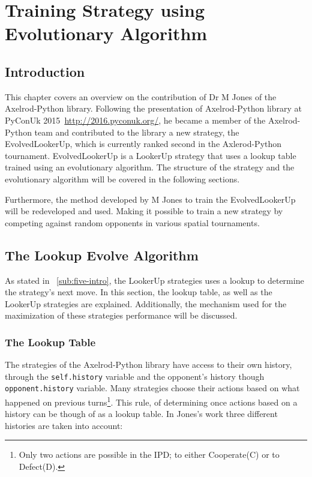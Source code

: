 \chapter{Training Strategy using Evolutionary Algorithm}
\section{Introduction}
\label{sub:five-intro}
This chapter covers an overview on the contribution of Dr M Jones
of the Axelrod-Python library. Following the presentation of Axelrod-Python
library at PyConUk 2015~\url{http://2016.pyconuk.org/}, he became a member of
the Axelrod-Python team and contributed to the library a new strategy, the
EvolvedLookerUp, which is currently ranked second in the Axlerod-Python tournament.
EvolvedLookerUp is a LookerUp strategy that uses a lookup table trained using an
evolutionary algorithm. The structure of the strategy and the evolutionary algorithm
will be covered in the following sections.

Furthermore, the method developed by M Jones to train the EvolvedLookerUp
will be redeveloped and used. Making it possible to train a new strategy
by competing against random opponents in various spatial tournaments.


\section{The Lookup Evolve Algorithm}
\label{sub:lookup-evolve-algorithm}
As stated in ~\autoref{sub:five-intro}, the LookerUp strategies uses a lookup to
determine the strategy's next move. In this section, the lookup table, as well as
the LookerUp strategies are explained. Additionally, the mechanism used for the
maximization of these strategies performance will be discussed.

\subsection{The Lookup Table}
The strategies of the Axelrod-Python library have access to their own history,
through the \texttt{self.history} variable and the opponent's history though
\texttt{opponent.history} variable. Many strategies choose their actions based
on what happened on previous turns\footnote{Only two actions are possible in the
IPD; to either Cooperate(C) or to Defect(D).}. This rule, of determining once actions
based on a history can be though of as a lookup table.
In Jones's work three different histories are taken into account:

